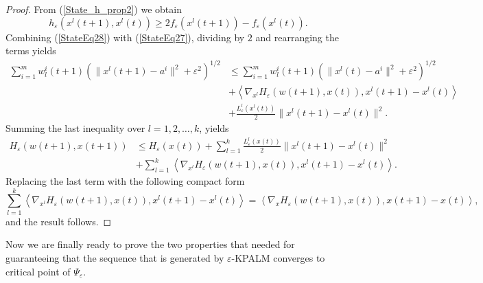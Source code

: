 \documentclass[11pt]{article}
\numberwithin{equation}{section}
\begin{document}
\begin{proof}
From (\ref{State_h_prop2}) we obtain
\begin{equation}
	h_{\varepsilon}(x^l(t+1),x^l(t)) \geq 2f_{\varepsilon}(x^l(t+1)) - f_{\varepsilon}(x^l(t)). \label{StateEq27}
\end{equation}
Combining (\ref{StateEq28}) with (\ref{StateEq27}), dividing by $2$ and rearranging the terms yields
\begin{equation*}
\begin{aligned}
	\sum\limits_{i=1}^{m} w^i_l(t+1) \left( \|x^l(t+1) - a^i\|^2 + {\varepsilon}^2 \right)^{1/2} 
	&\leq \sum\limits_{i=1}^{m} w^i_l(t+1) \left( \|x^l(t) - a^i\|^2 + {\varepsilon}^2 \right)^{1/2} \\
	&+ \left\langle \nabla_{x^l} H_{\varepsilon}(w(t+1),x(t)), x^l(t+1)-x^l(t) \right\rangle \\
	&+ \frac{L^l_{\varepsilon}(x^l(t))}{2} \|x^l(t+1)-x^l(t)\|^2 .
\end{aligned}
\end{equation*}
Summing the last inequality over $l=1,2, \ldots, k$, yields
\begin{equation*}
\begin{aligned}
	H_{\varepsilon}(w(t+1),x(t+1)) 
	&\leq H_{\varepsilon}(x(t)) + \sum\limits_{l=1}^{k} \frac{L^l_{\varepsilon}(x(t))}{2} \|x^l(t+1)-x^l(t)\|^2 \\
	&+ \sum\limits_{l=1}^{k} \left\langle \nabla_{x^l} H_{\varepsilon}(w(t+1),x(t)), x^l(t+1)-x^l(t) \right\rangle   .
\end{aligned}
\end{equation*}
Replacing the last term with the following compact form
\begin{equation*}
	\sum\limits_{l=1}^{k} \left\langle \nabla_{x^l} H_{\varepsilon}(w(t+1),x(t)), x^l(t+1)-x^l(t) \right\rangle  = \left\langle \nabla_x H_{\varepsilon}(w(t+1),x(t)), x(t+1)-x(t) \right\rangle ,
\end{equation*}
and the result follows.
\end{proof}

Now we are finally ready to prove the two properties that needed for guaranteeing that the sequence that is generated by $\varepsilon$-KPALM converges to critical point of $\Psi_{\varepsilon}$.
\end{document}
